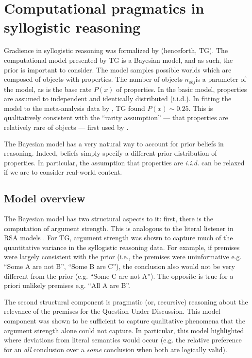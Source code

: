 \documentclass{llncs} %
\begin{document}
\section{Computational pragmatics in syllogistic reasoning}

Gradience in syllogistic reasoning was formalized by  (henceforth, TG). The computational model presented by TG is a Bayesian model, and as such, the prior is important to consider. The model samples possible worlds which are composed of objects with properties. The number of objects $n_{obj}$is a parameter of the model, as is the base rate $P(x)$ of properties. In the basic model, properties are assumed to independent and identically distributed (i.i.d.). In fitting the model to the meta-analysis data by , TG found $P(x) \sim 0.25$. This is qualitatively consistent with the ``rarity assumption'' --- that properties are relatively rare of objects --- first used by .

The Bayesian model has a very natural way to account for prior beliefs in reasoning. Indeed, beliefs simply specify a different prior distribution of properties. In particular, the assumption that properties are \emph{i.i.d.} can be relaxed if we are to consider real-world content.

\subsection{Model overview}

The Bayesian model has two structural aspects to it: first, there is the computation of argument strength. This is analogous to the literal listener in RSA models \cite{Frank2012,Goodman2013}. For TG,  argument strength was shown to capture much of the quantitative variance in the syllogistic reasoning data. For example, if premises were largely consistent with the prior (i.e., the premises were uninformative e.g. ``Some A are not B'', ``Some B are C''), the conclusion also would not be very different from the prior (e.g. ``Some C are not A''). The opposite is true for a priori unlikely premises e.g. ``All A are B''.  

The second structural component is pragmatic (or, recursive) reasoning about the relevance of the premises for the Question Under Discussion. This model component was shown to be sufficient to capture qualitative phenomena that the argument strength alone could not capture. In particular, this model highlighted where deviations from literal semantics would occur (e.g. the relative preference for an \emph{all} conclusion over a \emph{some} conclusion when both are logically valid). 
\end{document}
